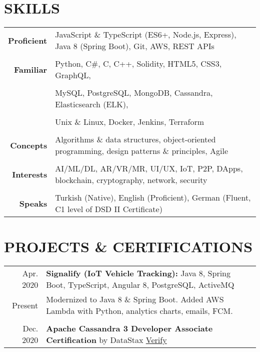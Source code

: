 \documentclass[a4paper, 10pt]{article}
\begin{document}
\section{SKILLS}
{\renewcommand{\arraystretch}{0.7}
\begin{tabular}{r p{15.4cm}}
    \textbf{Proficient} & JavaScript \& TypeScript (ES6+, Node.js, Express), Java 8 (Spring Boot), Git, AWS, REST APIs\\\\
    \textbf{Familiar} & Python, C\#, C, C++, Solidity, HTML5, CSS3, GraphQL,\\\\
    & MySQL, PostgreSQL, MongoDB, Cassandra, Elasticsearch (ELK),\\\\
    & Unix \& Linux, Docker, Jenkins, Terraform\\\\
    \textbf{Concepts} & Algorithms \& data structures, object-oriented programming, design patterns \& principles, Agile\\\\
    \textbf{Interests} & AI/ML/DL, AR/VR/MR, UI/UX, IoT, P2P, DApps, blockchain, cryptography, network, security\\\\
    \textbf{Speaks} & Turkish (Native), English (Proficient), German (Fluent, C1 level of DSD II Certificate)
\end{tabular}}

\section{PROJECTS \& CERTIFICATIONS}
\begin{tabular}{r p{15.7cm}}
    Apr. 2020 &  \textbf{Signalify (IoT Vehicle Tracking):} Java 8, Spring Boot, TypeScript, Angular 8, PostgreSQL, ActiveMQ\\
    Present & Modernized to Java 8 \& Spring Boot. Added AWS Lambda with Python, analytics charts, emails, FCM.\\\\
    Dec. 2020 & \textbf{Apache Cassandra 3 Developer Associate Certification} by DataStax \hspace{0.5em} \href{https://certification.mettl.com/datastax/applicant/result/download-certificate?key=v2gAI\%2BtQJaGeWin6S7cSag\%3D\%3D}{Verify}
\end{tabular}
\end{document}
